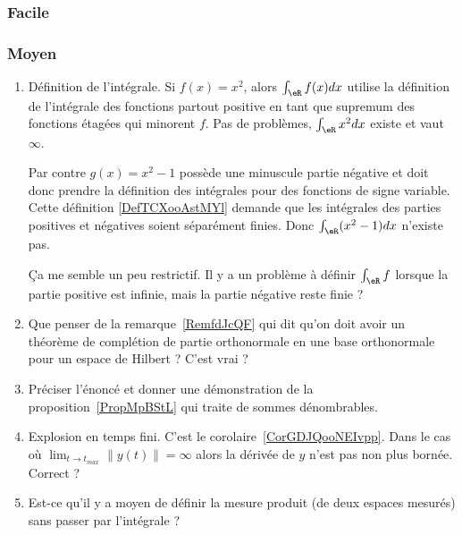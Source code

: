 \subsubsection{Facile}


\subsubsection{Moyen}

\begin{enumerate}
    \item
        Définition de l'intégrale. Si \( f(x)=x^2\), alors \( \int_{\eR}f(x)dx\) utilise la définition de l'intégrale des fonctions partout positive en tant que supremum des fonctions étagées qui minorent \( f\). Pas de problèmes, \( \int_{\eR}x^2dx\) existe et vaut \( \infty\).

        Par contre \( g(x)=x^2-1\) possède une minuscule partie négative et doit donc prendre la définition des intégrales pour des fonctions de signe variable. Cette définition \ref{DefTCXooAstMYl} demande que les intégrales des parties positives et négatives soient séparément finies. Donc \( \int_{\eR} (x^2-1)dx\) n'existe pas.

        Ça me semble un peu restrictif. Il y a un problème à définir \( \int_{\eR}f\) lorsque la partie positive est infinie, mais la partie négative reste finie ?
    \item
        Que penser de la remarque~\ref{RemfdJcQF} qui dit qu'on doit avoir un théorème de complétion de partie orthonormale en une base orthonormale pour un espace de Hilbert ? C'est vrai ?
    \item
        Préciser l'énoncé et donner une démonstration de la proposition~\ref{PropMpBStL} qui traite de sommes dénombrables.
    \item
        Explosion en temps fini. C'est le corolaire~\ref{CorGDJQooNEIvpp}. Dans le cas où \( \lim_{t\to t_{max}} \| y(t) \|=\infty\) alors la dérivée de \( y\) n'est pas non plus bornée. Correct ?
    \item
        Est-ce qu'il y a moyen de définir la mesure produit (de deux espaces mesurés) sans passer par l'intégrale ? 


\end{enumerate}
